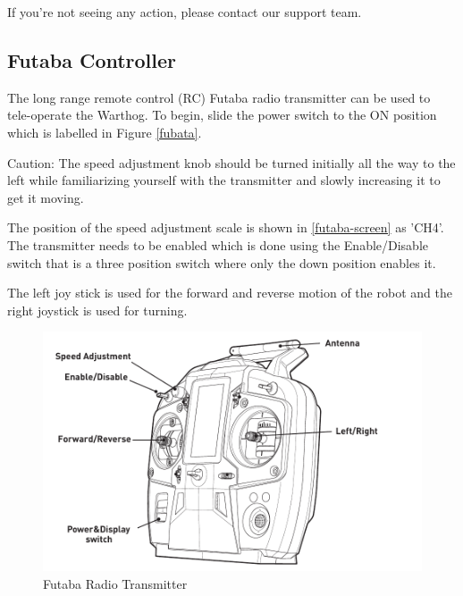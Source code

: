 \documentclass[]{clearpath-latex/clearpath-manual}
\begin{document}
If you’re not seeing any action, please contact our support team.

\subsection{Futaba Controller}

The long range remote control (RC) Futaba radio transmitter can be used to tele-operate the Warthog.
To begin, slide the power switch to the ON position which is labelled in Figure \autoref{fubata}.

\begin{warning}[]
Caution: The speed adjustment knob should be turned initially all the way to the left while familiarizing yourself with the transmitter and slowly increasing it to get it moving.
\end{warning}

The position of the speed adjustment scale is shown in  \autoref{futaba-screen} as 'CH4'.
The transmitter needs to be enabled which is done using the Enable/Disable switch that is a three position switch where only the down position enables it.

The left joy stick is used for the forward and reverse motion of the robot and the right joystick is used for turning.



\begin{figure}[!h]
  \centering
  \includegraphics[width=1.0\linewidth]{futaba.pdf}
  \caption{Futaba Radio Transmitter}
  \label{futaba}
\end{figure}
\end{document}
